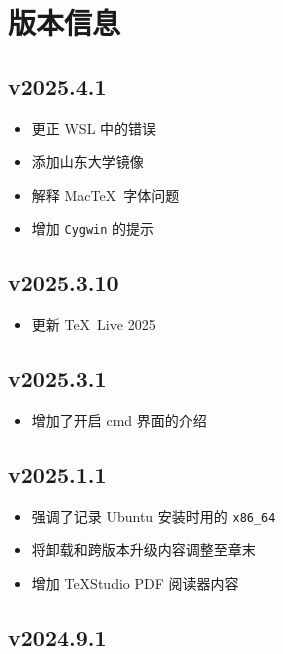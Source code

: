 
\chapter{版本信息}

\section*{v2025.4.1}

\begin{itemize}
  \item 更正 WSL 中的错误
  \item 添加山东大学镜像
  \item 解释 Mac\TeX\ 字体问题
  \item 增加 \texttt{Cygwin} 的提示
\end{itemize}

\section*{v2025.3.10}

\begin{itemize}
  \item 更新 \TeX\ Live 2025
\end{itemize}

\section*{v2025.3.1}

\begin{itemize}
  \item 增加了开启 \textsf{cmd} 界面的介绍
\end{itemize}

\section*{v2025.1.1}

\begin{itemize}
  \item 强调了记录 Ubuntu 安装时用的 \texttt{x86\_64}
  \item 将卸载和跨版本升级内容调整至章末
  \item 增加 \TeX Studio PDF 阅读器内容
\end{itemize}

\section*{v2024.9.1}

